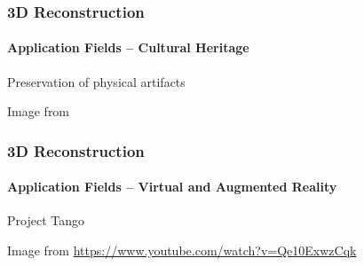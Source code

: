 \documentclass[xetex,professionalfont]{beamer}
\begin{document}
\begin{frame}
\frametitle{3D Reconstruction}
\framesubtitle{Application Fields -- Cultural Heritage} %

Preservation of physical artifacts

\bigskip
\begin{center}
    {\centering Image from \cite{levoy2000}}
\end{center}

\end{frame}


\begin{frame}
\frametitle{3D Reconstruction}
\framesubtitle{Application Fields -- Virtual and Augmented Reality}

Project Tango

\bigskip
\begin{center}
    {\centering Image from \url{https://www.youtube.com/watch?v=Qe10ExwzCqk}}
\end{center}

\end{frame}

\end{document}
